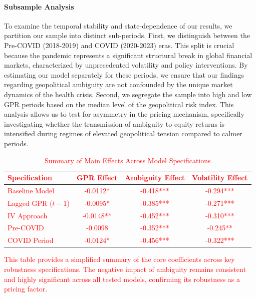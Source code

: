 \documentclass[preprint,12pt,authoryear]{elsarticle}
\begin{document}
\paragraph{Subsample Analysis} To examine the temporal stability and state-dependence of our results, we partition our sample into distinct sub-periods. First, we distinguish between the Pre-COVID (2018-2019) and COVID (2020-2023) eras. This split is crucial because the pandemic represents a significant structural break in global financial markets, characterized by unprecedented volatility and policy interventions. By estimating our model separately for these periods, we ensure that our findings regarding geopolitical ambiguity are not confounded by the unique market dynamics of the health crisis. Second, we segregate the sample into high and low GPR periods based on the median level of the geopolitical risk index. This analysis allows us to test for asymmetry in the pricing mechanism, specifically investigating whether the transmission of ambiguity to equity returns is intensified during regimes of elevated geopolitical tension compared to calmer periods.



\textcolor{red}{
\begin{table}[htbp]
\centering
\caption{Summary of Main Effects Across Model Specifications}
\label{tab:summary_effects}
\begin{threeparttable}
\begin{tabular*}{\textwidth}{@{\extracolsep{\fill}} lccc @{\extracolsep{\fill}}}
\toprule
Specification & GPR Effect & Ambiguity Effect & Volatility Effect \\
\midrule
Baseline Model & -0.0112* & -0.418*** & -0.294*** \\
Lagged GPR ($t-1$) & -0.0095* & -0.385*** & -0.271*** \\
IV Approach & -0.0148** & -0.452*** & -0.310*** \\
Pre-COVID & -0.0098 & -0.352*** & -0.245** \\
COVID Period & -0.0124* & -0.456*** & -0.322*** \\
\bottomrule
\end{tabular*}
\begin{tablenotes}[flushleft]
\small
\item[] This table provides a simplified summary of the core coefficients across key robustness specifications. The negative impact of ambiguity remains consistent and highly significant across all tested models, confirming its robustness as a pricing factor.
\end{tablenotes}
\end{threeparttable}
\end{table}
}
\end{document}
